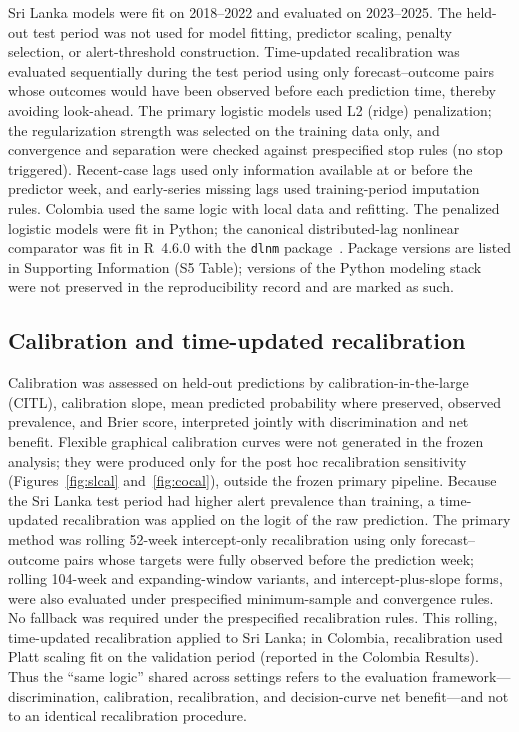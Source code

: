 \documentclass[11pt,a4paper]{article}
\begin{document}
Sri Lanka models were fit on 2018--2022 and evaluated on 2023--2025. The held-out test period was not used for model fitting, predictor scaling, penalty selection, or alert-threshold construction. Time-updated recalibration was evaluated sequentially during the test period using only forecast--outcome pairs whose outcomes would have been observed before each prediction time, thereby avoiding look-ahead. The primary logistic models used L2 (ridge) penalization; the regularization strength was selected on the training data only, and convergence and separation were checked against prespecified stop rules (no stop triggered). Recent-case lags used only information available at or before the predictor week, and early-series missing lags used training-period imputation rules. Colombia used the same logic with local data and refitting. The penalized logistic models were fit in Python; the canonical distributed-lag nonlinear comparator was fit in R~4.6.0 with the \texttt{dlnm} package~\cite{RCoreTeam2026,Gasparrini2011}. Package versions are listed in Supporting Information (S5 Table); versions of the Python modeling stack were not preserved in the reproducibility record and are marked as such.

\subsection{Calibration and time-updated recalibration}
Calibration was assessed on held-out predictions by calibration-in-the-large (CITL), calibration slope, mean predicted probability where preserved, observed prevalence, and Brier score, interpreted jointly with discrimination and net benefit. Flexible graphical calibration curves were not generated in the frozen analysis; they were produced only for the post hoc recalibration sensitivity (Figures~\ref{fig:slcal} and~\ref{fig:cocal}), outside the frozen primary pipeline. Because the Sri Lanka test period had higher alert prevalence than training, a time-updated recalibration was applied on the logit of the raw prediction. The primary method was rolling 52-week intercept-only recalibration using only forecast--outcome pairs whose targets were fully observed before the prediction week; rolling 104-week and expanding-window variants, and intercept-plus-slope forms, were also evaluated under prespecified minimum-sample and convergence rules. No fallback was required under the prespecified recalibration rules. This rolling, time-updated recalibration applied to Sri Lanka; in Colombia, recalibration used Platt scaling fit on the validation period (reported in the Colombia Results). Thus the ``same logic'' shared across settings refers to the evaluation framework---discrimination, calibration, recalibration, and decision-curve net benefit---and not to an identical recalibration procedure.
\end{document}
